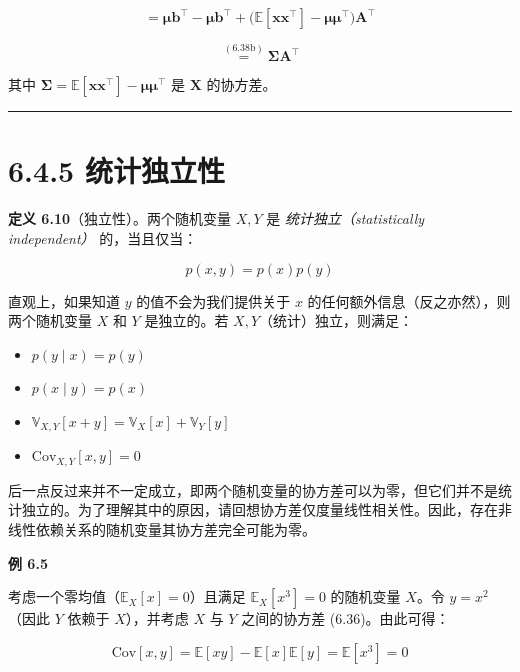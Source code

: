 \begin{equation}
= \boldsymbol{\mu}\boldsymbol{b}^\top - \boldsymbol{\mu}\boldsymbol{b}^\top + \big(\mathbb{E}[\boldsymbol{x}\boldsymbol{x}^\top] - \boldsymbol{\mu}\boldsymbol{\mu}^\top\big)\boldsymbol{A}^\top
\tag{6.52c}\label{eq:6-52c}
\end{equation}

\begin{equation}
\stackrel{(6.38\mathrm{b})}{=} \boldsymbol{\Sigma}\boldsymbol{A}^\top
\tag{6.52d}\label{eq:6-52d}
\end{equation}

其中 $ \boldsymbol{\Sigma} = \mathbb{E}[\boldsymbol{x}\boldsymbol{x}^\top] - \boldsymbol{\mu}\boldsymbol{\mu}^\top $ 是 $ \boldsymbol{X} $ 的协方差。

\medskip\hrule\medskip

\section*{6.4.5 统计独立性}

\textbf{定义 6.10}（独立性）。两个随机变量 $ X, Y $ 是 \emph{统计独立（statistically independent）} 的，当且仅当：

\begin{equation}
p(x, y) = p(x)p(y)
\tag{6.53}\label{eq:6-53}
\end{equation}

直观上，如果知道 $ y $ 的值不会为我们提供关于 $ x $ 的任何额外信息（反之亦然），则两个随机变量 $ X $ 和 $ Y $ 是独立的。若 $ X, Y $（统计）独立，则满足：

\begin{itemize}
\item $ p(y \mid x) = p(y) $
\item $ p(x \mid y) = p(x) $
\item $ \mathbb{V}_{X,Y}[x + y] = \mathbb{V}_X[x] + \mathbb{V}_Y[y] $
\item $ \mathrm{Cov}_{X,Y}[x, y] = 0 $
\end{itemize}

后一点反过来并不一定成立，即两个随机变量的协方差可以为零，但它们并不是统计独立的。为了理解其中的原因，请回想协方差仅度量线性相关性。因此，存在非线性依赖关系的随机变量其协方差完全可能为零。

\begin{notebox}
\textbf{例 6.5}
\end{notebox}

\begin{notebox}
考虑一个零均值（$ \mathbb{E}_X[x] = 0 $）且满足 $ \mathbb{E}_X[x^3] = 0 $ 的随机变量 $ X $。令 $ y = x^2 $（因此 $ Y $ 依赖于 $ X $），并考虑 $ X $ 与 $ Y $ 之间的协方差 (6.36)。由此可得：

\begin{equation}
\mathrm{Cov}[x, y] = \mathbb{E}[xy] - \mathbb{E}[x]\mathbb{E}[y] = \mathbb{E}[x^3] = 0
\tag{6.54}\label{eq:6-54}
\end{equation}
\end{notebox}

